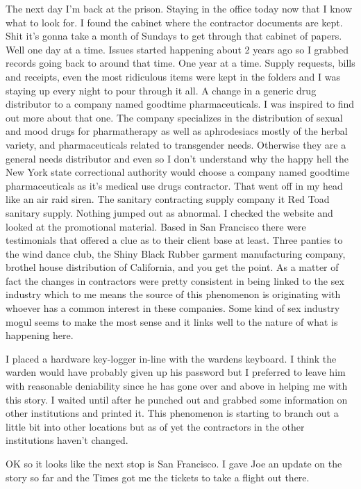 The next day I'm back at the prison. Staying in the office today now that I know what to look for. I found the cabinet where the contractor documents are kept. Shit it's gonna take a month of Sundays to get through that cabinet of papers. Well one day at a time. Issues started happening about 2 years ago so I grabbed records going back to around that time. One year at a time. Supply requests, bills and receipts, even the most ridiculous items were kept in the folders and I was staying up every night to pour through it all. A change in a generic drug distributor to a company named goodtime pharmaceuticals. I was inspired to find out more about that one. The company specializes in the distribution of sexual and mood drugs for pharmatherapy as well as aphrodesiacs mostly of the herbal variety, and pharmaceuticals related to transgender needs. Otherwise they are a general needs distributor and even so I don't understand why the happy hell the New York state correctional authority would choose a company named goodtime pharmaceuticals as it's medical use drugs contractor. That went off in my head like an air raid siren. The sanitary contracting supply company it Red Toad sanitary supply. Nothing jumped out as abnormal. I checked the website and looked at the promotional material. Based in San Francisco there were testimonials that offered a clue as to their client base at least. Three panties to the wind dance club, the Shiny Black Rubber garment manufacturing company, brothel house distribution of California, and you get the point. As a matter of fact the changes in contractors were pretty consistent in being linked to the sex industry which to me means the source of this phenomenon is originating with whoever has a common interest in these companies. Some kind of sex industry mogul seems to make the most sense and it links well to the nature of what is happening here.

I placed a hardware key-logger in-line with the wardens keyboard. I think the warden would have probably given up his password but I preferred to leave him with reasonable deniability since he has gone over and above in helping me with this story. I waited until after he punched out and grabbed some information on other institutions and printed it. This phenomenon is starting to branch out a little bit into other locations but as of yet the contractors in the other institutions haven't changed.

OK so it looks like the next stop is San Francisco. I gave Joe an update on the story so far and the Times got me the tickets to take a flight out there.

